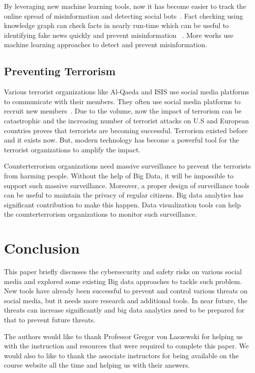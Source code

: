 \documentclass[sigconf]{acmart}
\begin{document}
By leveraging new machine learning tools, now it has become easier to track the online spread of misinformation and detecting social bots~\cite{Shao17hoaxybots, Shao15hoaxy}. Fact checking using knowledge graph can check facts in nearly run-time which can be useful to identifying fake news quickly and prevent misinformation ~\cite{Shiralkar2017Finding-Streams}. More works use machine learning approaches to detect and prevent misinformation.



\subsection{Preventing Terrorism}
Various terrorist organizations like Al-Qaeda and ISIS use social media platforms to communicate with their members. They often use social media platforms to recruit new members~\cite{terrorism}. Due to the volume, now the impact of terrorism can be catastrophic and the increasing number of terrorist attacks on U.S and European countries proves that terrorists are becoming successful. Terrorism existed before and it exists now. But, modern technology has become a powerful tool for the terrorist organizations to amplify the impact. 

Counterterrorism organizations need massive surveillance to prevent the terrorists from harming people. Without the help of Big Data, it will be impossible to support such massive surveillance. Moreover, a proper design of surveillance tools can be useful to maintain the privacy of regular citizens. Big data analytics has significant contribution to make this happen. Data visualization tools can help the counterterrorism organizations to monitor such surveillance.



\section{Conclusion}
This paper briefly discusses the cybersecurity and safety risks on various social media and explored some existing Big data approaches to tackle such problem. New tools have already been successful to prevent and control various threats on social media, but it needs more research and additional tools. In near future, the threats can increase significantly and big data analytics need to be prepared for that to prevent future threats.



\begin{acks}

The authors would like to thank Professor Gregor von Laszewski for helping us with the instruction and resources that were required to complete this paper. We would also to like to thank the associate instructors for being available on the course website all the time and helping us with their answers.

\end{acks}
\end{document}
